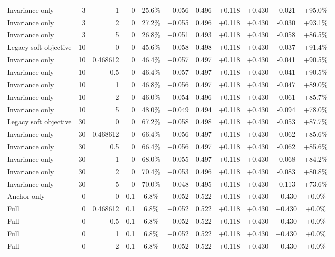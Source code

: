 \begin{table}[htbp]
\begin{tabular}{lrrrccccccc}
Invariance only & 3 & 1 & 0 & 25.6\% & +0.056 & 0.496 & +0.118 & +0.430 & -0.021 & +95.0\% \\
Invariance only & 3 & 2 & 0 & 27.2\% & +0.055 & 0.496 & +0.118 & +0.430 & -0.030 & +93.1\% \\
Invariance only & 3 & 5 & 0 & 26.8\% & +0.051 & 0.493 & +0.118 & +0.430 & -0.058 & +86.5\% \\
Legacy soft objective & 10 & 0 & 0 & 45.6\% & +0.058 & 0.498 & +0.118 & +0.430 & -0.037 & +91.4\% \\
Invariance only & 10 & 0.468612 & 0 & 46.4\% & +0.057 & 0.497 & +0.118 & +0.430 & -0.041 & +90.5\% \\
Invariance only & 10 & 0.5 & 0 & 46.4\% & +0.057 & 0.497 & +0.118 & +0.430 & -0.041 & +90.5\% \\
Invariance only & 10 & 1 & 0 & 46.8\% & +0.056 & 0.497 & +0.118 & +0.430 & -0.047 & +89.0\% \\
Invariance only & 10 & 2 & 0 & 46.0\% & +0.054 & 0.496 & +0.118 & +0.430 & -0.061 & +85.7\% \\
Invariance only & 10 & 5 & 0 & 48.0\% & +0.049 & 0.494 & +0.118 & +0.430 & -0.094 & +78.0\% \\
Legacy soft objective & 30 & 0 & 0 & 67.2\% & +0.058 & 0.498 & +0.118 & +0.430 & -0.053 & +87.7\% \\
Invariance only & 30 & 0.468612 & 0 & 66.4\% & +0.056 & 0.497 & +0.118 & +0.430 & -0.062 & +85.6\% \\
Invariance only & 30 & 0.5 & 0 & 66.4\% & +0.056 & 0.497 & +0.118 & +0.430 & -0.062 & +85.6\% \\
Invariance only & 30 & 1 & 0 & 68.0\% & +0.055 & 0.497 & +0.118 & +0.430 & -0.068 & +84.2\% \\
Invariance only & 30 & 2 & 0 & 70.4\% & +0.053 & 0.496 & +0.118 & +0.430 & -0.083 & +80.8\% \\
Invariance only & 30 & 5 & 0 & 70.0\% & +0.048 & 0.495 & +0.118 & +0.430 & -0.113 & +73.6\% \\
Anchor only & 0 & 0 & 0.1 & 6.8\% & +0.052 & 0.522 & +0.118 & +0.430 & +0.430 & +0.0\% \\
Full & 0 & 0.468612 & 0.1 & 6.8\% & +0.052 & 0.522 & +0.118 & +0.430 & +0.430 & +0.0\% \\
Full & 0 & 0.5 & 0.1 & 6.8\% & +0.052 & 0.522 & +0.118 & +0.430 & +0.430 & +0.0\% \\
Full & 0 & 1 & 0.1 & 6.8\% & +0.052 & 0.522 & +0.118 & +0.430 & +0.430 & +0.0\% \\
Full & 0 & 2 & 0.1 & 6.8\% & +0.052 & 0.522 & +0.118 & +0.430 & +0.430 & +0.0\% \\

\end{tabular}
\end{table}

